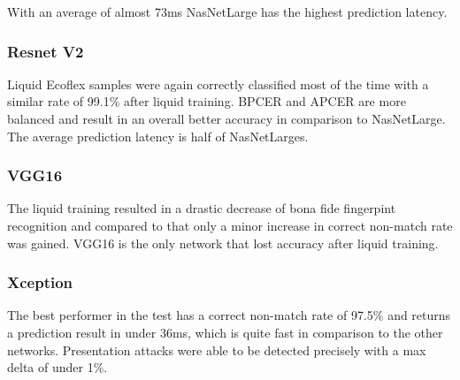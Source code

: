 With an average of almost 73ms NasNetLarge has the highest prediction latency.



\subsubsection{Resnet V2}
Liquid Ecoflex samples were again correctly classified most of the time with a similar rate of 99.1\% after liquid training.
BPCER and APCER are more balanced and result in an overall better accuracy in comparison to NasNetLarge.
The average prediction latency is half of NasNetLarges.



\subsubsection{VGG16}
The liquid training resulted in a drastic decrease of bona fide fingerpint recognition and compared to that only a minor increase in correct non-match rate was gained.
VGG16 is the only network that lost accuracy after liquid training.



\subsubsection{Xception}
The best performer in the test has a correct non-match rate of 97.5\% and returns a prediction result in under 36ms, which is quite fast in comparison to the other networks.
Presentation attacks were able to be detected precisely with a max delta of under 1\%.





\endinput





\subsubsection{EfficientNet B0}

The only BPCER over 90\% is achieved by EfficientNet B0 which is the second best performer over all.
Bona fide fingerprints were correctly detected with an accuracy of 92.5\%.

\predictiontables{efficientnet}



